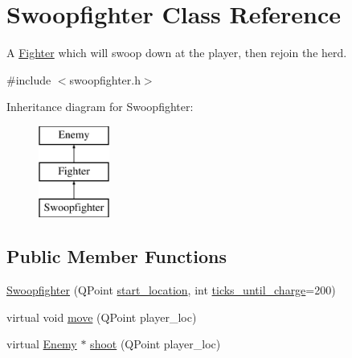 \hypertarget{classSwoopfighter}{
\section{Swoopfighter Class Reference}
\label{classSwoopfighter}
}


A \hyperlink{classFighter}{Fighter} which will swoop down at the player, then rejoin the herd.  




{\ttfamily \#include $<$swoopfighter.h$>$}

Inheritance diagram for Swoopfighter:\begin{figure}[H]
\begin{center}
\leavevmode
\includegraphics[height=3.000000cm]{classSwoopfighter}
\end{center}
\end{figure}
\subsection*{Public Member Functions}
\begin{DoxyCompactItemize}
\item 
\hyperlink{classSwoopfighter_ac57910bbcee89f51a726e76b031dffa6}{Swoopfighter} (QPoint \hyperlink{classSwoopfighter_a71dfa74fb88e8a89ce3a70ba968d8ffa}{start\_\-location}, int \hyperlink{classSwoopfighter_af3483b706640a6311f6a1659fd485764}{ticks\_\-until\_\-charge}=200)
\item 
virtual void \hyperlink{classSwoopfighter_a787914ca7a7fe222037385867e930480}{move} (QPoint player\_\-loc)
\item 
virtual \hyperlink{classEnemy}{Enemy} $\ast$ \hyperlink{classSwoopfighter_aba26309d58b59785f9dcbdc7f22d49bd}{shoot} (QPoint player\_\-loc)
\end{DoxyCompactItemize}
